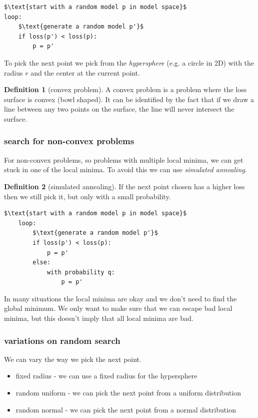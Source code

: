 \documentclass[12pt]{article}
\theoremstyle{definition}
\newtheorem{definition}{Definition}[section]
\begin{document}
\begin{lstlisting}[caption=random search]
$\text{start with a random model p in model space}$
loop:
    $\text{generate a random model p'}$
    if loss(p') < loss(p):
        p = p'
\end{lstlisting}

To pick the next point we pick from the \textit{hypersphere} (e.g. a circle in 2D) with the radius $r$ and the center at the current point.

\begin{definition}[convex problem]
    A convex problem is a problem where the loss surface is convex (bowl shaped). It can be identified by the fact that if we draw a line between any two points on the surface, the line will never intersect the surface. 
\end{definition}

\subsubsection*{search for non-convex problems}

For non-convex problems, so problems with multiple local minima, we can get stuck in one of the local minima. To avoid this we can use \textit{simulated annealing}.

\begin{definition}[simulated annealing]
    If the next point chosen has a higher loss then we still pick it, but only with a small probability.    
\end{definition}
\begin{lstlisting}[caption=simulated annealing]
    $\text{start with a random model p in model space}$
    loop:
        $\text{generate a random model p'}$
        if loss(p') < loss(p):
            p = p'
        else:
            with probability q: 
                p = p'
\end{lstlisting}

In many situations the local minima are okay and we don't need to find the global minimum. We only want to make sure that we can escape bad local minima, but this doesn't imply that all local minima are bad.

\subsubsection*{variations on random search}

We can vary the way we pick the next point. 

\begin{itemize}[leftmargin=*, noitemsep]
    \item fixed radius - we can use a fixed radius for the hypersphere
    \item random uniform - we can pick the next point from a uniform distribution
    \item random normal - we can pick the next point from a normal distribution
\end{itemize}
\end{document}
